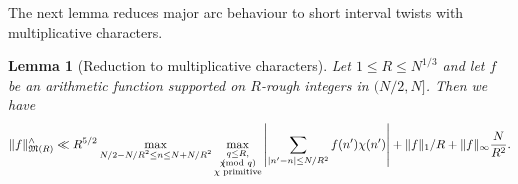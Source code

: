 \documentclass[12pt]{amsart}
\newtheorem{lemma}[theorem]{Lemma}
\theoremstyle{definition}
\theoremstyle{remark}
\numberwithin{equation}{section}
\newcommand{\1}{\mathbf{1}}
\let\oldpmod\pmod
\renewcommand{\pmod}[1]{\hspace{-0.12cm}\oldpmod {#1}}
\begin{document}
The next lemma reduces major arc behaviour to short interval twists with multiplicative characters.
\begin{lemma}[Reduction to multiplicative characters]\label{lem:Mtochar} Let $1\leq R\leq N^{1/3}$ and
    let $f$ be an arithmetic function supported on $R$-rough integers in $(N/2,N]$. Then we have 
    \begin{align*}
        \|f \|_{\mathfrak{M}(R)}^{\wedge}\ll R^{5/2} \max_{\substack{N/2-N/R^2\leq n\leq N+N/R^2}} \max_{\substack{q\leq R,\\ \chi\pmod {q}\\ \chi \textnormal{ primitive}}}\left|\sum_{|n'-n|\leq N/R^2} f(n') \chi(n') \right|+\|f\|_1/R+\|f\|_\infty \frac{N}{R^2}.
    \end{align*}
\end{lemma}
\end{document}
